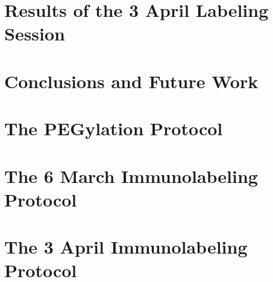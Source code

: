 \documentclass{hmcthesis}
\begin{document}

\newpage
\chapter{Results of the 3 April Labeling Session}
\label{resultsofthe3aprillabelingsession}


\newpage
\chapter{Conclusions and Future Work}
\label{conclusionsandfuturework}



\appendix
\chapter{The PEGylation Protocol}
\label{ThePEGylationProtocol}


\chapter{The 6 March Immunolabeling Protocol}
\label{The6MarchImmunolabelingProtocol}



\chapter{The 3 April Immunolabeling Protocol}
\label{The3AprilImmunolabelingProtocol}



\newpage

\backmatter




\end{document}
